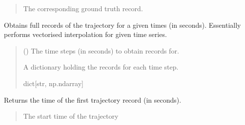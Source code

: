 \documentclass[letterpaper,10pt,english]{sphinxmanual}
\begin{document}
\begin{fulllineitems}
\begin{fulllineitems}
\begin{quote}
\begin{description}
\sphinxAtStartPar
The corresponding ground truth record.

\sphinxAtStartPar
{\hyperref[\detokenize{modules/waypoints/trajectory:qnav.waypoints.trajectory.GroundTruth}]{}}

\end{description}\end{quote}

\end{fulllineitems}


\begin{fulllineitems}
\label{\detokenize{modules/waypoints/trajectory:qnav.waypoints.trajectory.Trajectory.get_records}}
\pysigstartsignatures
{}
\pysigstopsignatures
\sphinxAtStartPar
Obtains full records of the trajectory for a given times (in seconds).
Essentially performs vectorised interpolation for given time series.
\begin{quote}\begin{description}
\sphinxAtStartPar
{} () \textendash{} The time steps (in seconds) to obtain records for.

\sphinxAtStartPar
A dictionary holding the records for each time step.

\sphinxAtStartPar
dict{[}str, np.ndarray{]}

\end{description}\end{quote}

\end{fulllineitems}


\begin{fulllineitems}
\label{\detokenize{modules/waypoints/trajectory:qnav.waypoints.trajectory.Trajectory.start_time}}
\pysigstartsignatures
{}
\pysigstopsignatures
\sphinxAtStartPar
Returns the time of the first trajectory record (in seconds).
\begin{quote}\begin{description}
\sphinxAtStartPar
The start time of the trajectory


\end{description}
\end{quote}
\end{fulllineitems}
\end{fulllineitems}
\end{document}
